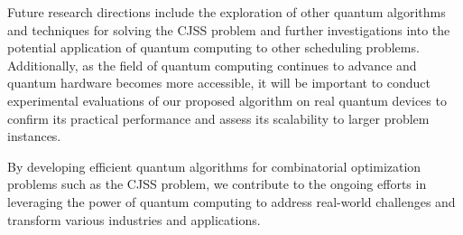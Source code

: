 Future research directions include the exploration of other quantum algorithms and techniques for solving the CJSS problem and further investigations into the potential application of quantum computing to other scheduling problems. Additionally, as the field of quantum computing continues to advance and quantum hardware becomes more accessible, it will be important to conduct experimental evaluations of our proposed algorithm on real quantum devices to confirm its practical performance and assess its scalability to larger problem instances.

By developing efficient quantum algorithms for combinatorial optimization problems such as the CJSS problem, we contribute to the ongoing efforts in leveraging the power of quantum computing to address real-world challenges and transform various industries and applications.

